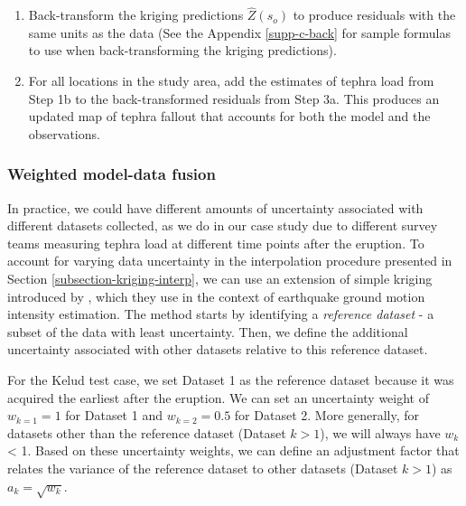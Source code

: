 \begin{enumerate}
    \begin{enumerate}
    \item
    Back-transform the kriging predictions $\hat{Z}(s_{o})$ to produce residuals with the same units as the data (See the Appendix \ref{supp-c-back} for sample formulas to use when back-transforming the kriging predictions).
     
    \item
    For all locations in the study area, add the estimates of tephra load from Step 1b to the back-transformed residuals from Step 3a. This produces an updated map of tephra fallout that accounts for both the model and the observations.
        
    \end{enumerate}
    
    
    
\end{enumerate}


\subsubsection{Weighted model-data fusion} \label{subsection-kriging-worden}

    In practice, we could have different amounts of uncertainty associated with different datasets collected, as we do in our case study due to different survey teams measuring tephra load at different time points after the eruption. To account for varying data uncertainty in the interpolation procedure presented in Section \ref{subsection-kriging-interp}, we can use an extension of simple kriging introduced by \cite{worden2018}, which they use in the context of earthquake ground motion intensity estimation. The method starts by identifying a \textit{reference dataset} - a subset of the data with least uncertainty. Then, we define the additional uncertainty associated with other datasets relative to this reference dataset.
  
    For the Kelud test case, we set Dataset 1 as the reference dataset because it was acquired the earliest after the eruption. We can set an uncertainty weight of $w_{k=1} = 1$ for Dataset 1 and $w_{k=2} = 0.5$ for Dataset 2. More generally, for datasets other than the reference dataset (Dataset $k > 1$), we will always have $w_{k}$ < 1. Based on these uncertainty weights, we can define an adjustment factor that relates the variance of the reference dataset to other datasets (Dataset $k > 1$) as $a_{k} = \sqrt{w_{k}}$.
  
